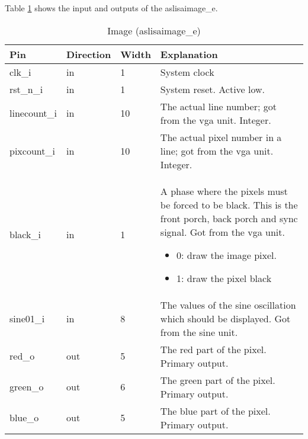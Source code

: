 
Table \ref{tab:asPer10} shows the input and outputs of the aslisaimage\_e.
\begin{table}[H]
\caption{Image (aslisaimage\_e)}
\label{tab:asPer10}
\centering
\begin{tabularx}{\textwidth}{|l |l |l |X|}
  \hline
  Pin & Direction & Width & Explanation \\
  \hline
  \hline
  clk\_i & in & 1 & System clock \\
  \hline
  rst\_n\_i & in & 1 & System reset. Active low. \\
  \hline
  linecount\_i & in & 10 & The actual line number; got from the vga unit. Integer. \\
  \hline
  pixcount\_i & in & 10 & The actual pixel number in a line; got from the vga unit. Integer. \\
  \hline
  black\_i & in & 1 &  A phase where the pixels must be forced to be black. This is the front porch, back porch and sync signal. Got from the vga unit. \begin{itemize} \item 0: draw the image pixel. \item 1: draw the pixel black \end{itemize} \\
  \hline
  sine01\_i & in & 8 &  The values of the sine oscillation which should be displayed. Got from the sine unit. \\
  \hline
  red\_o & out & 5 &  The red part of the pixel. Primary output.\\
  \hline
  green\_o & out & 6 &  The green part of the pixel. Primary output.\\
  \hline
  blue\_o & out & 5 &  The blue part of the pixel. Primary output.\\
  \hline
\end{tabularx}
\end{table}
